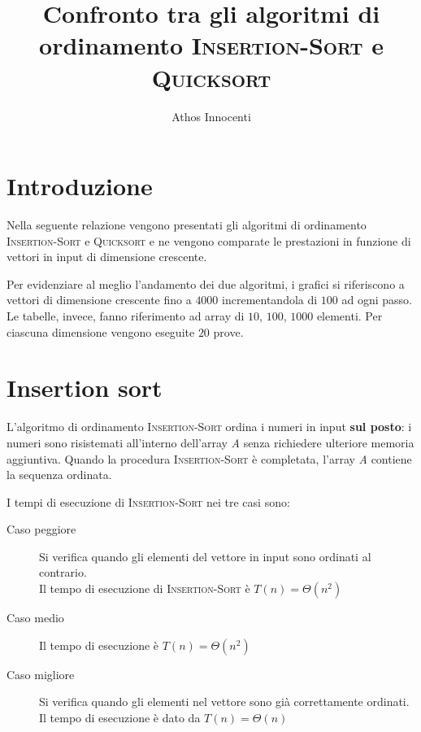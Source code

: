 \documentclass[11pt]{article}
\begin{document}
\title{\Large Confronto tra gli algoritmi di ordinamento \textsc{Insertion-Sort} e \textsc{Quicksort}}\date{}
\author{Athos Innocenti}
\maketitle
\section{Introduzione}
Nella seguente relazione vengono presentati gli algoritmi di ordinamento \textsc{Insertion-Sort} e \textsc{Quicksort} e ne vengono comparate le prestazioni in funzione di vettori in input di dimensione crescente.

Per evidenziare al meglio l'andamento dei due algoritmi, i grafici si riferiscono a vettori di dimensione crescente fino a $4000$ incrementandola di $100$ ad ogni passo. Le tabelle, invece, fanno riferimento ad array di $10$, $100$, $1000$ elementi. Per ciascuna dimensione vengono eseguite $20$ prove.
\section{Insertion sort}
L'algoritmo di ordinamento \textsc{Insertion-Sort} ordina i numeri in input \textbf{sul posto}: i numeri sono risistemati all'interno dell'array \textit{A} senza richiedere ulteriore memoria aggiuntiva. Quando la procedura \textsc{Insertion-Sort}  è completata, l'array \textit{A} contiene la sequenza ordinata.

I tempi di esecuzione di \textsc{Insertion-Sort} nei tre casi sono:
\begin{description}
\item[Caso peggiore]Si verifica quando gli elementi del vettore in input sono ordinati al contrario.\\Il tempo di esecuzione di \textsc{Insertion-Sort} è $T(n) = \Theta(n^2)$
\item[Caso medio]Il tempo di esecuzione è $T(n) = \Theta(n^2)$
\item[Caso migliore]Si verifica quando gli elementi nel vettore sono già correttamente ordinati.\\Il tempo di esecuzione è dato da $T(n) = \Theta(n)$
\end{description}
\end{document}
